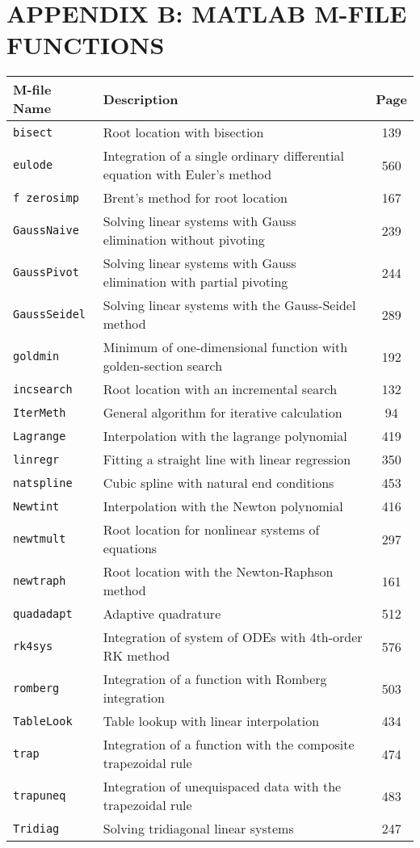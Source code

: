 \documentclass[../main.tex]{subfiles}
\begin{document}
    
\chapter*{APPENDIX B: MATLAB M-FILE FUNCTIONS}

\begin{tabular}{llc} 
    M-file Name & Description & Page \\
    \hline \texttt{bisect} & Root location with bisection & 139 \\
    \texttt{eulode} & Integration of a single ordinary differential equation with Euler's method & 560 \\
    \texttt{f zerosimp} & Brent's method for root location & 167 \\
    \texttt{GaussNaive} & Solving linear systems with Gauss elimination without pivoting & 239 \\
    \texttt{GaussPivot} & Solving linear systems with Gauss elimination with partial pivoting & 244 \\
    \texttt{GaussSeidel} & Solving linear systems with the Gauss-Seidel method & 289 \\
    \texttt{goldmin} & Minimum of one-dimensional function with golden-section search & 192 \\
    \texttt{incsearch} & Root location with an incremental search & 132 \\
    \texttt{IterMeth} & General algorithm for iterative calculation & 94 \\
    \texttt{Lagrange} & Interpolation with the lagrange polynomial & 419 \\
    \texttt{linregr} & Fitting a straight line with linear regression & 350 \\
    \texttt{natspline} & Cubic spline with natural end conditions & 453 \\
    \texttt{Newtint} & Interpolation with the Newton polynomial & 416 \\
    \texttt{newtmult} & Root location for nonlinear systems of equations & 297 \\
    \texttt{newtraph} & Root location with the Newton-Raphson method & 161 \\
    \texttt{quadadapt} & Adaptive quadrature & 512 \\
    \texttt{rk4sys} & Integration of system of ODEs with 4th-order RK method & 576 \\
    \texttt{romberg} & Integration of a function with Romberg integration & 503 \\
    \texttt{TableLook} & Table lookup with linear interpolation & 434 \\
    \texttt{trap} & Integration of a function with the composite trapezoidal rule & 474 \\
    \texttt{trapuneq} & Integration of unequispaced data with the trapezoidal rule & 483 \\
    \texttt{Tridiag} & Solving tridiagonal linear systems & 247
    \end{tabular}
    
\end{document}
